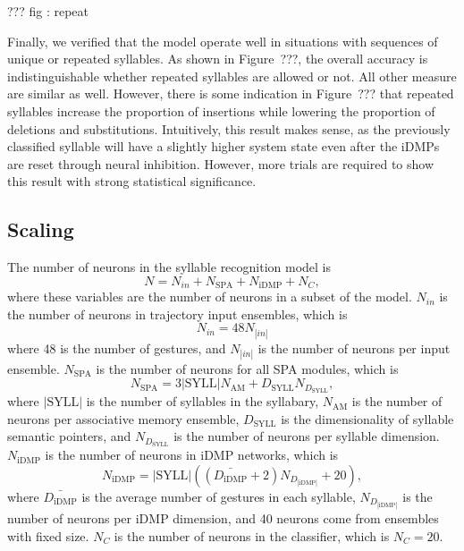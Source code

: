 ??? fig : repeat

Finally, we verified that the model
operate well in situations with
sequences of unique or repeated syllables.
As shown in Figure~???,
the overall accuracy is indistinguishable
whether repeated syllables are allowed or not.
All other measure are similar as well.
However, there is some indication
in Figure~??? that repeated syllables
increase the proportion of insertions
while lowering the proportion of
deletions and substitutions.
Intuitively, this result makes sense,
as the previously classified syllable
will have a slightly higher system state
even after the iDMPs are reset
through neural inhibition.
However, more trials are required
to show this result
with strong statistical significance.

\subsection{Scaling}

The number of neurons in the
syllable recognition model is
\begin{equation}
  N = N_{in} + N_{\text{SPA}} + N_{\text{iDMP}} + N_C,
\end{equation}
where these variables
are the number of neurons in
a subset of the model.
$N_{in}$ is the number of neurons
in trajectory input ensembles, which is
\begin{equation}
  N_{in} = 48 N_{|in|}
\end{equation}
where 48 is the number of gestures,
and $N_{|in|}$ is the number of neurons
per input ensemble.
$N_{\text{SPA}}$ is the number of
neurons for all SPA modules,
which is
\begin{equation}
  N_{\text{SPA}} = 3 |\text{SYLL}| N_{\text{AM}}
    + D_{\text{SYLL}} N_D_{\text{SYLL}},
\end{equation}
where $|\text{SYLL}|$ is the number of
syllables in the syllabary,
$N_{\text{AM}}$ is the number of neurons
per associative memory ensemble,
$D_{\text{SYLL}}$ is the dimensionality
of syllable semantic pointers,
and $N_D_{\text{SYLL}}$ is the number of neurons
per syllable dimension.
$N_{\text{iDMP}}$ is the number of neurons
in iDMP networks, which is
\begin{equation}
  N_{\text{iDMP}} = |\text{SYLL}| \left( \left(\bar{D_{\text{iDMP}}} + 2 \right)
    N_D_{|\text{iDMP}|} + 20 \right),
\end{equation}
where $\bar{D_{\text{iDMP}}}$ is the average
number of gestures in each syllable,
$N_D_{|\text{iDMP}|}$ is the number of neurons
per iDMP dimension,
and 40 neurons come from ensembles with fixed size.
$N_C$ is the number of neurons
in the classifier,
which is $N_C = 20$.

